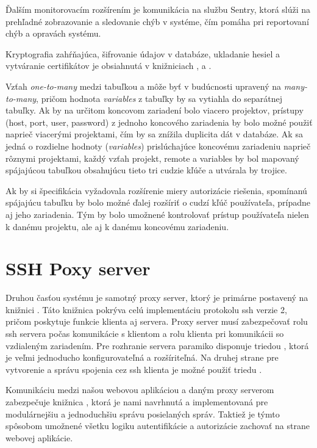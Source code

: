 Ďalším monitorovacím rozšírením je komunikácia na službu Sentry, ktorá slúži na prehľadné zobrazovanie a sledovanie chýb v
systéme, čím pomáha pri reportovaní chýb a opravách systému.

Kryptografia zahŕňajúca, šifrovanie údajov v databáze, ukladanie hesiel a vytváranie certifikátov je obsiahnutá v knižniciach
,  a .

Vzťah \emph{one-to-many} medzi tabuľkou  a  môže byť v budúcnosti upravený na \emph{many-to-many},
pričom hodnota \emph{variables} z tabuľky  by sa vytiahla do separátnej tabuľky.
Ak by na určitom koncovom zariadení bolo viacero projektov, prístupy (host, port, user, password) z jednoho koncového zariadenia
by bolo možné použiť naprieč viacerými projektami, čím by sa znížila duplicita dát v databáze.
Ak sa jedná o rozdielne hodnoty (\emph{variables}) prislúchajúce koncovému zariadeniu naprieč rôznymi projektami, každý
vzťah projekt, remote a variables by bol mapovaný spájajúcou tabuľkou obsahujúcu tieto tri cudzie kľúče a utvárala by trojice.

Ak by si špecifikácia vyžadovala rozšírenie miery autorizácie riešenia, spomínanú spájajúcu tabuľku by bolo možné ďalej
rozšíriť o cudzí kľúč používateľa, prípadne aj jeho zariadenia.
Tým by bolo umožnené kontrolovať prístup používateľa nielen k danému projektu, ale aj k danému koncovému zariadeniu.

\section{SSH Poxy server}\label{sec:ssh-proxy-server}

Druhou časťou systému je samotný proxy server, ktorý je primárne postavený na knižnici .
Táto knižnica pokrýva celú implementáciu protokolu ssh verzie 2, pričom poskytuje funkcie klienta aj servera.
Proxy server musí zabezpečovať rolu ssh servera počas komunikácie s klientom a rolu klienta pri komunikácii so vzdialeným
zariadením.
Pre rozhranie servera paramiko disponuje triedou , ktorá je veľmi jednoducho konfigurovateľná
a rozšíriteľná.
Na druhej strane pre vytvorenie a správu spojenia cez ssh klienta je možné použiť triedu .

Komunikáciu medzi našou webovou aplikáciou a daným proxy serverom zabezpečuje knižnica ,
ktorá je nami navrhnutá a implementovaná pre modulárnejšiu a jednoduchšiu správu posielaných správ.
Taktiež je týmto spôsobom umožnené všetku logiku autentifikácie a autorizácie zachovať na strane webovej aplikácie.

